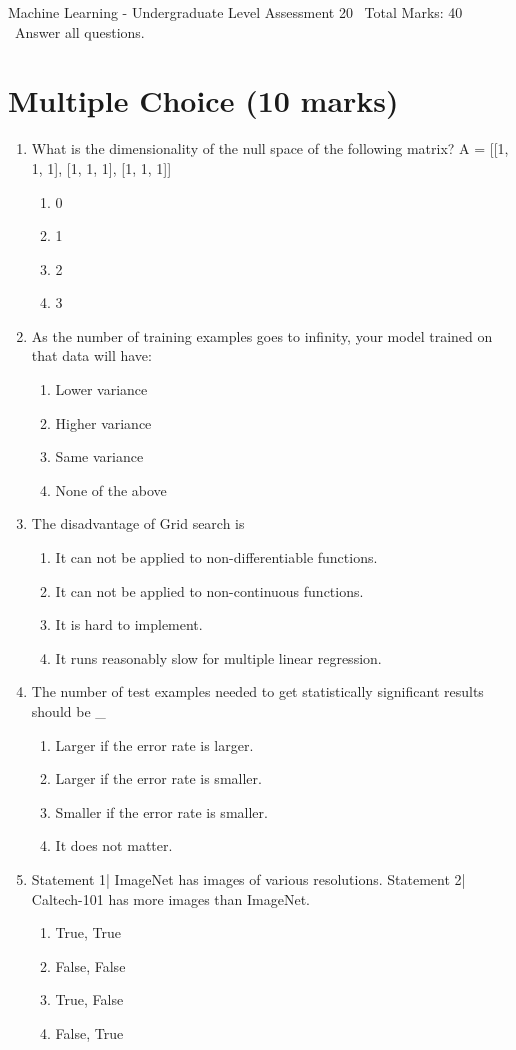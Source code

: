 \documentclass[12pt]{article}
\begin{document}
\begin{center}
Machine Learning - Undergraduate Level Assessment 20 \
Total Marks: 40 \
Answer all questions.
\end{center}

\section*{Multiple Choice (10 marks)}
\begin{enumerate}[label=\arabic*.]
\item What is the dimensionality of the null space of the following matrix? A = [[1, 1, 1], [1, 1, 1], [1, 1, 1]]
\begin{enumerate}[label=(\alph*)]
    \item 0
    \item 1
    \item 2
    \item 3
\end{enumerate}
\item As the number of training examples goes to infinity, your model trained on that data will have:
\begin{enumerate}[label=(\alph*)]
    \item Lower variance
    \item Higher variance
    \item Same variance
    \item None of the above
\end{enumerate}
\item The disadvantage of Grid search is
\begin{enumerate}[label=(\alph*)]
    \item It can not be applied to non-differentiable functions.
    \item It can not be applied to non-continuous functions.
    \item It is hard to implement.
    \item It runs reasonably slow for multiple linear regression.
\end{enumerate}
\item The number of test examples needed to get statistically significant results should be \_
\begin{enumerate}[label=(\alph*)]
    \item Larger if the error rate is larger.
    \item Larger if the error rate is smaller.
    \item Smaller if the error rate is smaller.
    \item It does not matter.
\end{enumerate}
\item Statement 1| ImageNet has images of various resolutions. Statement 2| Caltech-101 has more images than ImageNet.
\begin{enumerate}[label=(\alph*)]
    \item True, True
    \item False, False
    \item True, False
    \item False, True
\end{enumerate}
\end{enumerate}
\end{document}
